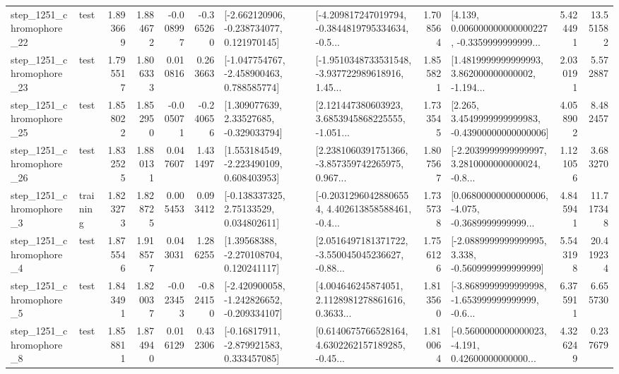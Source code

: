 \begin{tabular}{llrrrrllrlrr}
 step\_1251\_chromophore\_22 &      test &      1.893669 &    1.884672 &     -0.008997 & -0.365260 &   [-2.662120906, -0.238734077, 0.121970145] &  [-4.209817247019794, -0.3844819795334634, -0.5... &       1.708564 &  [4.139, 0.006000000000000227, -0.3359999999999... &            5.424491 &         13.551582 \\
 step\_1251\_chromophore\_23 &      test &      1.795517 &    1.806333 &      0.010816 &  0.263663 &   [-1.047754767, -2.458900463, 0.788585774] &  [-1.9510348733531548, -3.937722989618916, 1.45... &       1.855821 &  [1.4819999999999993, 3.862000000000002, -1.194... &            2.030191 &          5.572887 \\
 step\_1251\_chromophore\_25 &      test &      1.858022 &    1.852950 &     -0.005071 & -0.240656 &     [1.309077639, 2.33527685, -0.329033794] &  [2.121447380603923, 3.6853945868225555, -1.051... &       1.733545 &  [2.265, 3.4549999999999983, -0.43900000000000006] &            4.058902 &          8.482457 \\
 step\_1251\_chromophore\_26 &      test &      1.832525 &    1.880131 &      0.047607 &  1.431497 &    [1.553184549, -2.223490109, 0.608403953] &  [2.2381060391751366, -3.857359742265975, 0.967... &       1.807567 &  [-2.2039999999999997, 3.2810000000000024, -0.8... &            1.121056 &          3.683270 \\
  step\_1251\_chromophore\_3 &  training &      1.823273 &    1.828725 &      0.005453 &  0.093412 &     [-0.138337325, 2.75133529, 0.034802611] &  [-0.20312960428806554, 4.402613858588461, -0.4... &       1.735738 &  [0.06800000000000006, -4.075, -0.3689999999999... &            4.845941 &         11.717348 \\
  step\_1251\_chromophore\_4 &      test &      1.875546 &    1.918577 &      0.043031 &  1.286255 &     [1.39568388, -2.270108704, 0.120241117] &  [2.0516497181371722, -3.550045045236627, -0.88... &       1.756126 &  [-2.0889999999999995, 3.338, -0.5609999999999999] &            5.543198 &         20.419234 \\
  step\_1251\_chromophore\_5 &      test &      1.843491 &    1.820037 &     -0.023453 & -0.824150 &  [-2.420900058, -1.242826652, -0.209334107] &  [4.004646245874051, 2.1128981278861616, 0.3633... &       1.813560 &  [-3.8689999999999998, -1.653999999999999, -0.6... &            6.375911 &          6.655730 \\
  step\_1251\_chromophore\_8 &      test &      1.858811 &    1.874940 &      0.016129 &  0.432306 &    [-0.16817911, -2.879921583, 0.333457085] &  [0.6140675766528164, 4.6302262157189285, -0.45... &       1.810064 &  [-0.5600000000000023, -4.191, 0.42600000000000... &            4.326249 &          0.237679 \\

\end{tabular}
